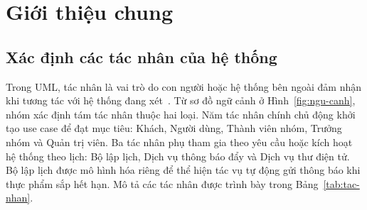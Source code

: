 \section{Giới thiệu chung}\label{sec:gioi-thieu-chung}

\subsection{Xác định các tác nhân của hệ thống}\label{ssec:tac-nhan}

Trong UML, tác nhân là vai trò do con người hoặc hệ thống bên ngoài đảm nhận khi tương tác với hệ thống đang xét~\cite{cockburn}. Từ sơ đồ ngữ cảnh ở Hình~\ref{fig:ngu-canh}, nhóm xác định tám tác nhân thuộc hai loại. Năm tác nhân chính chủ động khởi tạo use case để đạt mục tiêu: Khách, Người dùng, Thành viên nhóm, Trưởng nhóm và Quản trị viên. Ba tác nhân phụ tham gia theo yêu cầu hoặc kích hoạt hệ thống theo lịch: Bộ lập lịch, Dịch vụ thông báo đẩy và Dịch vụ thư điện tử. Bộ lập lịch được mô hình hóa riêng để thể hiện tác vụ tự động gửi thông báo khi thực phẩm sắp hết hạn. Mô tả các tác nhân được trình bày trong Bảng~\ref{tab:tac-nhan}.

